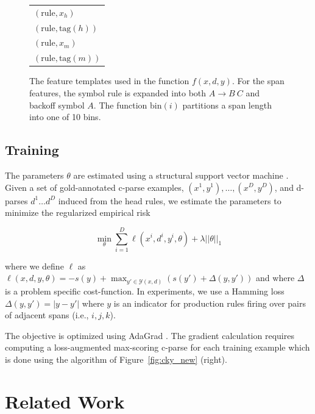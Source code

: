 \documentclass[11pt,letterpaper]{article}
\newcommand{\RuleSym}{\mathrm{rule}}
\newcommand{\Rule}[3]{#1 \rightarrow #2\ #3}
\newcommand{\BinFN}[1]{\mathrm{bin}({#1})}
\newcommand{\TagFN}[1]{\mathrm{tag}({#1})}
\newcommand{\WordFN}[1]{x_{#1}}
\newcommand{\nascomment}[1]{\textcolor{blue}{\bf \small [#1 --nas]}}
\begin{document}
\begin{figure}
\begin{multicols}{2}
\begin{tabular}{l}
  $(\RuleSym, \WordFN{h})$ \\
  $(\RuleSym, \TagFN{h})$ \\
  $(\RuleSym, \WordFN{m})$ \\
  $(\RuleSym, \TagFN{m})$ \\

  \bottomrule

  \end{tabular}
  \end{multicols}

  \caption{The feature templates used in the function $f(x, d, y)$. For the span features, the symbol $\RuleSym$ is expanded into both $\Rule{A}{B}{C}$ and backoff symbol $A$. The function $\BinFN{i}$ partitions a span length into one of 10 bins.
   \label{fig:features} }
\end{figure}

\subsection{Training}

The parameters $\theta$ are estimated using a structural support
vector machine \cite{taskar-04}.
Given a set of gold-annotated c-parse examples, $(x^{1}, y^{1}), \ldots,
(x^{D}, y^{D})$, and d-parses $d^{1} \ldots d^{D}$ induced
from the head rules, we estimate the
parameters to minimize the regularized empirical risk

\[ \min_{\theta} \sum_{i = 1}^D  \ell( x^{i}, d^{i} , y^{i}, \theta)  + \lambda ||\theta||_1 \]

\noindent where we define $\ell$ as
$\ell(x, d, y, \theta) = - s(y) + \max_{y' \in \mathcal{Y}(x, d)}\left(s(y')  + \Delta(y, y') \right) $
\noindent and where $\Delta$ is a problem specific cost-function.
In experiments, we use a Hamming loss  $\Delta(y, y') = | y -y'|$
where $y$ is an indicator for production rules firing over pairs of
adjacent spans (i.e., $i, j, k$).

The objective is optimized using AdaGrad \cite{duchi2011adaptive}.  The gradient
calculation requires computing a loss-augmented max-scoring c-parse for each
training example which is done using the algorithm of
Figure~\ref{fig:cky_new} (right).


\section{Related Work}
\end{document}
